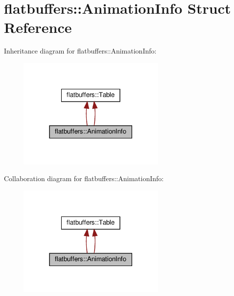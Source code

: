 \hypertarget{structflatbuffers_1_1AnimationInfo}{}\section{flatbuffers\+:\+:Animation\+Info Struct Reference}
\label{structflatbuffers_1_1AnimationInfo}


Inheritance diagram for flatbuffers\+:\+:Animation\+Info\+:
\nopagebreak
\begin{figure}[H]
\begin{center}
\leavevmode
\includegraphics[width=206pt]{structflatbuffers_1_1AnimationInfo__inherit__graph}
\end{center}
\end{figure}


Collaboration diagram for flatbuffers\+:\+:Animation\+Info\+:
\nopagebreak
\begin{figure}[H]
\begin{center}
\leavevmode
\includegraphics[width=206pt]{structflatbuffers_1_1AnimationInfo__coll__graph}
\end{center}
\end{figure}
